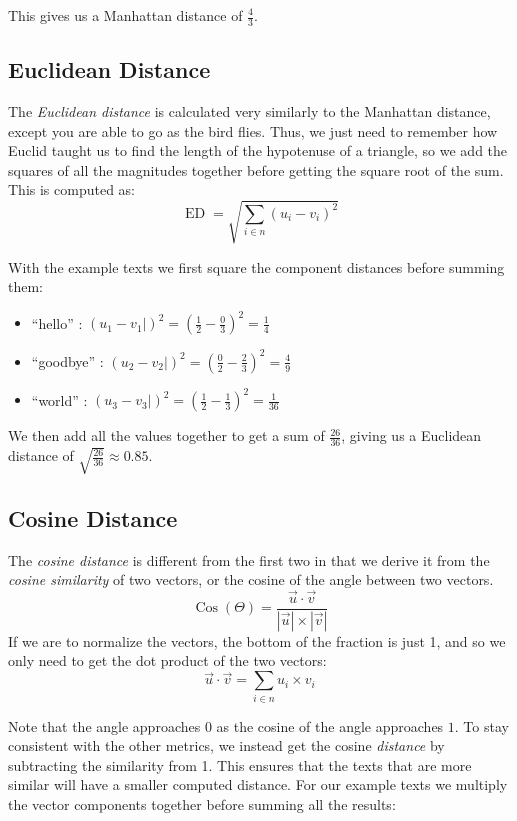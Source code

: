 \noindent This gives us a Manhattan distance of $\frac43$.

\subsection{Euclidean Distance}

The \emph{Euclidean distance} is calculated very similarly to the Manhattan
distance, except you are able to go as the bird flies. Thus, we just need to
remember how Euclid taught us to find the length of the hypotenuse of a
triangle, so we add the squares of all the magnitudes together before getting
the square root of the sum. This is computed as:
\[
  \operatorname{ED} = \sqrt{\displaystyle\sum_{i\in n} (u_i - v_i)^2 }
\]

\noindent With the example texts we first square the component distances before
summing them:
\begin{itemize}
  \item ``hello'' : $(u_1 - v_1|)^2 = (\frac12 - \frac03)^2 = \frac14$
  \item ``goodbye'' : $(u_2 - v_2|)^2 = (\frac02 - \frac23)^2 = \frac49$
  \item ``world'' : $(u_3 - v_3|)^2 = (\frac12 - \frac13)^2 = \frac1{36}$
\end{itemize}

\noindent We then add all the values together to get a sum of $\frac{26}{36}$,
giving us a Euclidean distance of $\sqrt{\frac{26}{36}} \approx 0.85$.

\subsection{Cosine Distance}

The \emph{cosine distance} is different from the first two in that we derive it
from the \emph{cosine similarity} of two vectors, or the cosine of the angle
between two vectors.
\[
  \operatorname{Cos}(\Theta) = \displaystyle\frac{\vec{u}\cdot
  \vec{v}}{|\vec{u}|\times|\vec{v}|}
\]
If we are to normalize the vectors, the bottom of the fraction is just 1, and so
we only need to get the dot product of the two vectors:
\[
  \vec u\cdot \vec v = \displaystyle\sum_{i \in n} u_i \times v_i
\]

Note that the angle approaches $0$ as the cosine of the angle approaches $1$.
To stay consistent with the other metrics, we instead get the cosine
\emph{distance} by subtracting the similarity from 1.  This ensures that the
texts that are more similar will have a smaller computed distance. For our
example texts we multiply the vector components together before summing all the
results:


